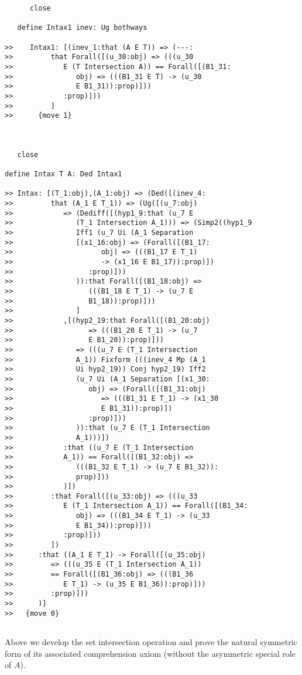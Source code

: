 \documentclass[12pt]{article}
\begin{document}
\begin{verbatim}
      close

   define Intax1 inev: Ug bothways

>>    Intax1: [(inev_1:that (A E T)) => (---:
>>         that Forall([(u_30:obj) => (((u_30
>>            E (T Intersection A)) == Forall([(B1_31:
>>               obj) => (((B1_31 E T) -> (u_30
>>               E B1_31)):prop)]))
>>            :prop)]))
>>         ]
>>      {move 1}



   close

define Intax T A: Ded Intax1

>> Intax: [(T_1:obj),(A_1:obj) => (Ded([(inev_4:
>>         that (A_1 E T_1)) => (Ug([(u_7:obj)
>>            => (Dediff([(hyp1_9:that (u_7 E
>>               (T_1 Intersection A_1))) => (Simp2((hyp1_9
>>               Iff1 (u_7 Ui (A_1 Separation
>>               [(x1_16:obj) => (Forall([(B1_17:
>>                     obj) => (((B1_17 E T_1)
>>                     -> (x1_16 E B1_17)):prop)])
>>                  :prop)]))
>>               )):that Forall([(B1_18:obj) =>
>>                  (((B1_18 E T_1) -> (u_7 E
>>                  B1_18)):prop)]))
>>               ]
>>            ,[(hyp2_19:that Forall([(B1_20:obj)
>>                  => (((B1_20 E T_1) -> (u_7
>>                  E B1_20)):prop)]))
>>               => (((u_7 E (T_1 Intersection
>>               A_1)) Fixform (((inev_4 Mp (A_1
>>               Ui hyp2_19)) Conj hyp2_19) Iff2
>>               (u_7 Ui (A_1 Separation [(x1_30:
>>                  obj) => (Forall([(B1_31:obj)
>>                     => (((B1_31 E T_1) -> (x1_30
>>                     E B1_31)):prop)])
>>                  :prop)]))
>>               )):that (u_7 E (T_1 Intersection
>>               A_1)))])
>>            :that ((u_7 E (T_1 Intersection
>>            A_1)) == Forall([(B1_32:obj) =>
>>               (((B1_32 E T_1) -> (u_7 E B1_32)):
>>               prop)]))
>>            )])
>>         :that Forall([(u_33:obj) => (((u_33
>>            E (T_1 Intersection A_1)) == Forall([(B1_34:
>>               obj) => (((B1_34 E T_1) -> (u_33
>>               E B1_34)):prop)]))
>>            :prop)]))
>>         ])
>>      :that ((A_1 E T_1) -> Forall([(u_35:obj)
>>         => (((u_35 E (T_1 Intersection A_1))
>>         == Forall([(B1_36:obj) => (((B1_36
>>            E T_1) -> (u_35 E B1_36)):prop)]))
>>         :prop)]))
>>      )]
>>   {move 0}


\end{verbatim}

Above we develop the set intersection operation and prove the natural symmetric form of its associated comprehension axiom (without the asymmetric special role of $A$).
\end{document}
